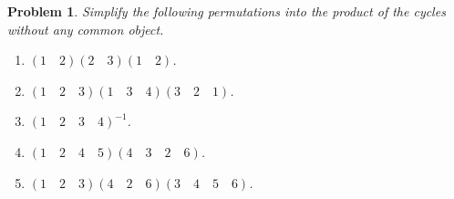 \documentclass[UTF8,10pt,a4paper]{article}
\theoremstyle{Problem}
\newtheorem{prob}{Problem}
\theoremstyle{Solution}
\begin{document}
\thispagestyle{FirstPageStyle}
\begin{prob}
    Simplify the following permutations into the product of the cycles without any common object.
    \begin{enumerate}
        \item[(a)] $(1\quad 2)(2\quad 3)(1\quad 2)$.
        \item[(b)] $(1\quad 2\quad 3)(1\quad 3\quad 4)(3\quad 2\quad 1)$.
        \item[(c)] $(1\quad 2\quad 3\quad 4)^{-1}$.
        \item[(d)] $(1\quad 2\quad 4\quad 5)(4\quad 3\quad 2\quad 6)$.
        \item[(e)] $(1\quad 2\quad 3)(4\quad 2\quad 6)(3\quad 4\quad 5\quad 6)$.
    \end{enumerate}
\end{prob}
\end{document}

